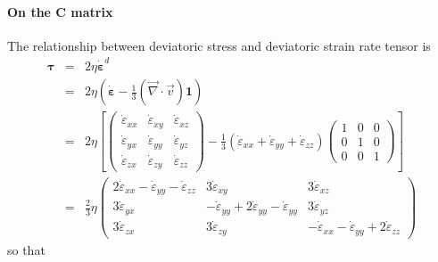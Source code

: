 \paragraph{On the ${\bm C}$ matrix}

The relationship between deviatoric stress and deviatoric strain rate tensor is 
\begin{eqnarray}
\bm \tau 
&=& 2 \eta \dot{\bm \varepsilon}^d \\
&=& 2 \eta \left( \dot{\bm \varepsilon} -\frac{1}{3}(\vec\nabla\cdot\vec v) {\bm 1} \right) \\
&=& 2 \eta
\left[ 
\left(
\begin{array}{ccc}
\dot\varepsilon_{xx} & \dot\varepsilon_{xy} & \dot\varepsilon_{xz} \\ 
\dot\varepsilon_{yx} & \dot\varepsilon_{yy} & \dot\varepsilon_{yz} \\ 
\dot\varepsilon_{zx} & \dot\varepsilon_{zy} & \dot\varepsilon_{zz} 
\end{array}
\right)
-
\frac{1}{3}
(\dot\varepsilon_{xx} + \dot\varepsilon_{yy} +  \dot\varepsilon_{zz})
\left(
\begin{array}{ccc}
1 &0 &0 \\
0 &1 &0\\ 
0 &0 &1 
\end{array}
\right)
\right] \\
&=& \frac{2}{3} \eta
\left(
\begin{array}{ccc}
2\dot\varepsilon_{xx} -\dot\varepsilon_{yy} -\dot\varepsilon_{zz} & 
3\dot\varepsilon_{xy} &
3\dot\varepsilon_{xz} \\ 
3\dot\varepsilon_{yx} & 
-\dot\varepsilon_{yy} +2\dot\varepsilon_{yy} -\dot\varepsilon_{yy} & 
3\dot\varepsilon_{yz} \\ 
3\dot\varepsilon_{zx} & 
3\dot\varepsilon_{zy} & 
-\dot\varepsilon_{xx} -\dot\varepsilon_{yy} + 2\dot\varepsilon_{zz}  
\end{array}
\right)
\end{eqnarray}
so that 
